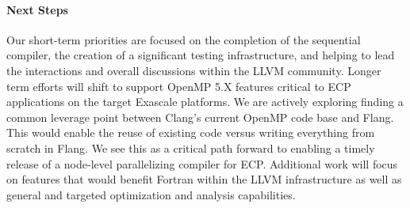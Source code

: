 \paragraph{Next Steps}
Our short-term priorities are focused on the completion of the
sequential compiler, the creation of a significant testing
infrastructure, and helping to lead the interactions and overall
discussions within the LLVM community.  Longer term efforts
will shift to support OpenMP 5.X features critical to ECP applications
on the target Exascale platforms.  We are actively exploring finding a
common leverage point between Clang's current OpenMP code base and
Flang.  This would enable the reuse of existing code versus writing
everything from scratch in Flang.  We see this as a critical path
forward to enabling a timely release of a node-level parallelizing
compiler for ECP.  Additional work will focus on features that would
benefit Fortran within the LLVM infrastructure as well as general and
targeted optimization and analysis capabilities.

